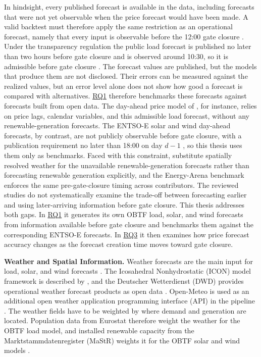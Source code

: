 In hindsight, every published forecast is available in the data, including
forecasts that were not yet observable when the price forecast would have been
made. A valid backtest must therefore apply the same restriction as an
operational forecast, namely that every input is observable before the 12:00
gate closure \cite{epexSpotPowerMarket}. Under the transparency regulation the public load
forecast is published no later than two hours before gate closure and is
observed around 10:30, so it is admissible before gate closure
\cite{euRegulation543_2013,entsoeTransparency}. The forecast values are published, but the models that produce them are not
disclosed. Their errors can be measured against the realized values, but an error level
alone does not show how good a forecast is compared with alternatives. \hyperlink{rq:component_forecast_quality}{RQ1} therefore benchmarks
these forecasts against forecasts built from open data. The day-ahead price model of
\textcite{uniejewski2025smoothing}, for instance, relies on price lags, calendar
variables, and this admissible load forecast, without any
renewable-generation forecasts.
The \mbox{ENTSO-E} solar and wind day-ahead forecasts, by contrast, are not
publicly observable before gate closure, with a publication requirement no later
than 18:00 on day \(d-1\)
\cite{kleinebrahm2026energyarena,euRegulation543_2013}, so this thesis uses them
only as benchmarks. Faced with this constraint,
\textcite{eiser2026operational} substitute spatially resolved weather for the
unavailable renewable-generation forecasts rather than forecasting renewable generation
explicitly, and the Energy-Arena benchmark \cite{kleinebrahm2026energyarena}
enforces the same pre-gate-closure timing across contributors. The reviewed
studies do not systematically examine the trade-off between forecasting earlier
and using later-arriving information before gate closure.
This thesis addresses both gaps. In
\hyperlink{rq:component_forecast_quality}{RQ1} it generates its own OBTF load, solar, and wind forecasts from information available before gate closure and benchmarks
them against the corresponding \mbox{ENTSO-E} forecasts. In
\hyperlink{rq:cutoff_sensitivity}{RQ3} it then examines how price forecast
accuracy changes as the forecast creation time moves toward gate closure.

\noindent\textbf{Weather and Spatial Information.}
Weather forecasts are the main input for load, solar, and wind forecasts
\cite{hong2016probabilisticLoad,antonanzas2016pvForecasting,foley2012windForecasting}.
The Icosahedral Nonhydrostatic (ICON) model framework is described by
\textcite{zaengl2015icon}, and the Deutscher Wetterdienst (DWD) provides operational weather
forecast products as open data \cite{dwdIconForecastData}. Open-Meteo is used as an
additional open weather application programming interface (API) in the pipeline \cite{openMeteoForecastApi}. The
weather fields have to be weighted by where demand and generation are located.
Population data from Eurostat therefore weight the weather for the OBTF load model,
and installed renewable capacity from the Marktstammdatenregister (MaStR) weights it for
the OBTF solar and wind models \cite{eurostatGisco2021,bundesnetzagenturMastr}.

